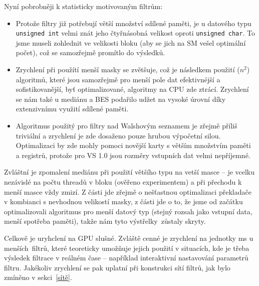     Nyní pobrobněji k statisticky motivovaným filtrům:
    \begin{itemize}
      \item Protože filtry již potřebují větší množství sdílené paměti, je u datového typu {\tt unsigned int} velmi znát jeho čtyřnásobná velikost oproti {\tt unsigned char}. To jsme museli zohlednit ve velikosti bloku (aby se jich na SM vešel optimální počet), což se samozřejmě promítlo do výsledků.
      \item Zrychlení při použítí menší masky se zvětšuje, což je následkem použití \OOO($n^2$) algoritmů, které jsou samozřejmě pro menší pole dat efektivnéjší a sofistikovanější, byť optimalizované, algoritmy na CPU zde ztrácí. Zrychlení se nám také u mediánu a BES podařilo udžet na vysoké úrovní díky extenzivnímu využití sdílené paměti.
      \item Algoritmus použitý pro filtry nad Walshovým seznamem je zřejmě příliš triviální a zrychlení je zde dosaženo pouze hrubou výpočetní silou. Optimalizaci by zde mohly pomoci novější karty s větším množstvím paměti a registrů, protože pro VS 1.0 jsou rozměry vstupních dat velmi nepříjemné.
    \end{itemize}

    Zvláštní je zpomalení mediánu při použití většího typu na vetší masce -- je vcelku nezávislé na počtu threadů v bloku (ověřeno experimentem) a při přechodu k menší masce vždy zmizí. Z části jde zřejmě o nešťastnou optimalizaci překladače v kombianci s nevhodnou velikostí masky, z části jde o to, že jsme od začátku optimalizovali algoritmus pro menší datový typ (stejný rozsah jako vstupní data, menší spotřeba paměti), takže nám tyto \bq výstřelky\eq ~zůstaly skryty.

    \vspace{0.5cm}

    Celkově je uryhclení na GPU slušné. Zvláště cenné je zrychlení na jednotky ms u \bq menších\eq ~filtrů, které teoreticky umožňuje jejich použití v situacích, kde je třeba výsledek filtrace v reálném čase -- například interaktivní nastavování parametrů filtru. Jakékoliv zrychlení se pak uplatní při konstrukci sítí filtrů, jak bylo zmíněno v sekci~\ref{sítě}.















